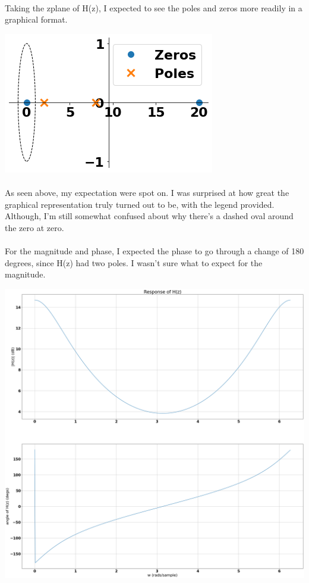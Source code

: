 \documentclass[12pt]{report}
\begin{document}
    \paragraph{} Taking the zplane of H(z), I expected to see the poles and zeros more readily in a graphical format. 
    
    \includegraphics[]{Figure 2022-04-05 213446 (0).png}
    
    \paragraph{} As seen above, my expectation were spot on. I was surprised at how great the graphical representation truly turned out to be, with the legend provided. Although, I'm still somewhat confused about why there's a dashed oval around the zero at zero.
    
    \paragraph{} For the magnitude and phase, I expected the phase to go through a change of 180 degrees, since H(z) had two poles. I wasn't sure what to expect for the magnitude.
    
    \includegraphics[scale=0.25]{Figure 2022-04-05 213446 (1).png}
    
\end{document}
